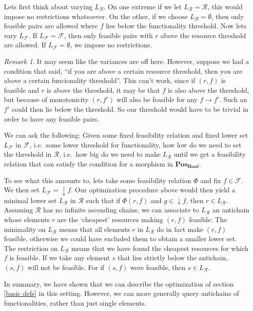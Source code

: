 \documentclass[12pt]{article}
\theoremstyle{definition}
\theoremstyle{plain}
\theoremstyle{plain}
\theoremstyle{plain}
\theoremstyle{plain}
\theoremstyle{remark}
\theoremstyle{remark}
\newtheorem{remark}{Remark}[section]
\newcommand{\mc}[1]{\mathcal{#1}}
\begin{document}
Lets first think about varying $L_\mc{R}$. On one extreme if we let $L_\mc{R} = \mc{R}$, this would impose no restrictions whatsoever. On the other, if we choose $L_\mc{R} = \emptyset$, then only feasible pairs are allowed where $f$ lies below the functionality threshold. Now lets vary $L_\mc{F}$. If $L_\mc{F} = \mc{F}$, then only feasible pairs with $r$ above the resource threshold are allowed. If $L_\mc{F} = \emptyset$, we impose no restrictions. 

\begin{remark}
	It may seem like the variances are off here. However, suppose we had a condition that said, ``if you are above a certain resource threshold, then you are above a certain funcionality threshold''. This can't work, since if $(r,f)$ is feasible and $r$ is above the threshold, it may be that $f$ is also above the threshold, but because of monotonicity $(r,f')$ will also be feasible for any $f \rightarrow f'$. Such an $f'$ could then lie below the threshold. So our threshold would have to be trivial in order to have any feasible pairs.
\end{remark}

We can ask the following: Given some fixed feasibility relation and fixed lower set $L_\mc{F}$ in $\mc{F}$, i.e.~some lower threshold for functionality, how low do we need to set the threshold in $\mc{R}$, i.e.~how big do we need to make $L_\mc{R}$ until we get a feasibility relation that can satisfy the condition for a morphism in $\mathbf{Pos_{Bool}}$.

To see what this amounts to, lets take some feasibility relation $\Phi$ and fix $f \in \mc{F}$. We then set $L_\mc{F} = \downarrow f$. Our optimization procedure above would then yield a minimal lower set $L_\mc{R}$ in $\mc{R}$ such that if $\Phi(r,f)$ and $g \in \downarrow f$, then $r \in L_\mc{R}$. Assuming $\mc{R}$ has no infinite ascending chains, we can associate to $L_\mc{R}$ an antichain whose elements $r$ are the `cheapest' resources making $(r,f)$ feasible: The minimality on $L_\mc{R}$ means that all elements $r$ in $L_\mc{R}$ do in fact make $(r,f)$ feasible, otherwise we could have excluded them to obtain a smaller lower set. The restriction on $L_\mc{R}$ means that we have found the cheapest resources for which $f$ is feasible. If we take any element $s$ that lies strictly below the antichain, $(s,f)$ will not be feasible. For if $(s,f)$ were feasible, then $s \in L_\mc{R}$. 

In summary, we have shown that we can describe the optimization of section \ref{basic defs} in this setting. However, we can more generally query antichains of functionalities, rather than just single elements.
\end{document}
